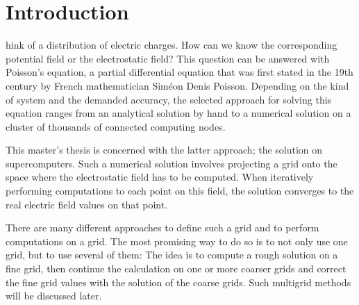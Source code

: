 %
%


\let\textcircled=\pgftextcircled
\chapter{Introduction}
\label{chap:intro}

hink of a distribution of electric charges. How can we know the corresponding potential field or the electrostatic field? This question can be answered with Poisson's equation, a partial differential equation that was first stated in the 19th century by French mathematician Siméon Denis Poisson. Depending on the kind of system and the demanded accuracy, the selected approach for solving this equation ranges from an analytical solution by hand to a numerical solution on a cluster of thousands of connected computing nodes. 

This master's thesis is concerned with the latter approach; the solution on supercomputers. Such a numerical solution involves projecting a grid onto the space where the electrostatic field has to be computed. When iteratively performing computations to each point on this field, the solution converges to the real electric field values on that point. 

There are many different approaches to define such a grid and to perform computations on a grid. The most promising way to do so is to not only use one grid, but to use several of them: The idea is to compute a rough solution on a fine grid, then continue the calculation on one or more coarser grids and correct the fine grid values with the solution of the coarse grids. Such multigrid methods will be discussed later. 

